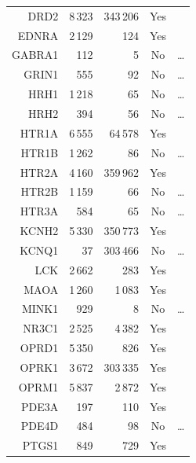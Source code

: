 \documentclass[10pt,article]{memoir}
\begin{document}
\begin{table}
\begin{tabular}{rrrcc}
    DRD2    &       8\,323  &       343\,206    &   Yes     &       \\
    EDNRA   &       2\,129  &       124         &   Yes     &       \\
    GABRA1  &       112     &       5           &   No      &       \ldots     \\
    GRIN1   &       555     &       92          &   No      &       \ldots     \\
    HRH1    &       1\,218  &       65          &   No      &       \ldots     \\
    HRH2    &       394     &       56          &   No      &       \ldots     \\
    HTR1A   &       6\,555  &       64\,578     &   Yes     &       \\
    HTR1B   &       1\,262  &       86          &   No      &       \ldots     \\
    HTR2A   &       4\,160  &       359\,962    &   Yes     &       \\
    HTR2B   &       1\,159  &       66          &   No      &       \ldots     \\
    HTR3A   &       584     &       65          &   No      &       \ldots     \\
    KCNH2   &       5\,330  &       350\,773    &   Yes     &       \\
    KCNQ1   &       37      &       303\,466    &   No      &       \ldots     \\
    LCK     &       2\,662  &       283         &   Yes     &       \\
    MAOA    &       1\,260  &       1\,083      &   Yes     &       \\
    MINK1   &       929     &       8           &   No      &       \ldots     \\
    NR3C1   &       2\,525  &       4\,382      &   Yes     &       \\
    OPRD1   &       5\,350  &       826         &   Yes     &       \\
    OPRK1   &       3\,672  &       303\,335    &   Yes     &       \\
    OPRM1   &       5\,837  &       2\,872      &   Yes     &       \\
    PDE3A   &       197     &       110         &   Yes     &       \\
    PDE4D   &       484     &       98          &   No      &       \ldots     \\
    PTGS1   &       849     &       729         &   Yes     &       \\

\end{tabular}
\end{table}
\end{document}
